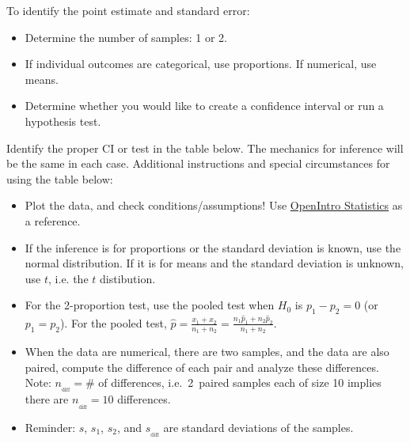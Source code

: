 \documentclass[11pt]{article}
\begin{document}
\noindent To identify the point estimate and standard error:\vspace{-1mm}
\begin{itemize}
\setlength{\itemsep}{0mm}
\item Determine the number of samples: 1 or 2.
\item If individual outcomes are categorical, use proportions. If numerical, use means.
\item Determine whether you would like to create a confidence interval or run a hypothesis test.
\end{itemize}
\noindent Identify the proper CI or test in the table below. The mechanics for inference will be the same in each case. Additional instructions and special circumstances for using the table below:\vspace{-1mm}
\begin{itemize}
\setlength{\itemsep}{0mm}
\item  Plot the data, and check conditions/assumptions! Use \href{http://www.openintro.org/stat/textbook.php}{OpenIntro Statistics} as a reference.
\item If the inference is for proportions or the standard deviation is known, use the normal distribution. If it is for means and the standard deviation is unknown, use $t$, i.e. the $t$ distibution.
\item For the 2-proportion test, use the pooled test when $H_0$ is $p_1-p_2=0$ (or $p_1=p_2$). For the pooled test, $\hat{p} = \frac{x_1 + x_2}{n_1+n_2} = \frac{n_1\hat{p}_1 + n_2\hat{p}_2}{n_1+n_2}$.
\item When the data are numerical, there are two samples, and the data are also paired, compute the difference of each pair and analyze these differences. Note: $n_{_{\text{diff}}}=\#$ of differences, i.e.~2~paired samples each of size 10 implies there are $n_{_{\text{diff}}}=10$ differences.
\item Reminder: $s$, $s_1$, $s_2$, and $s_{_{\text{diff}}}$ are standard deviations of the samples.\vspace{-2mm}
\end{itemize}
\end{document}
